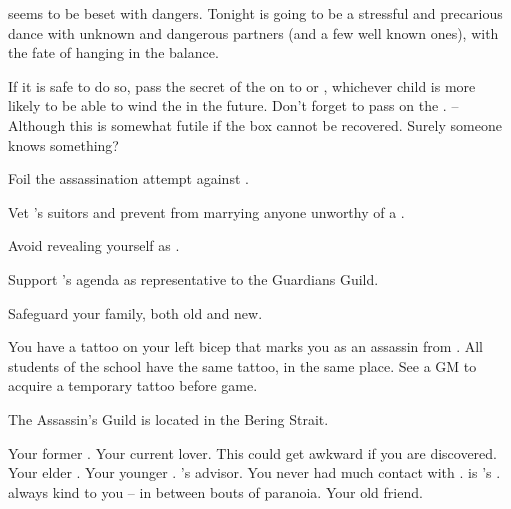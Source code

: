 \documentclass[char]{NeptuneBall}
\begin{document}
\pAtlantis{} seems to be beset with dangers. Tonight is going to be a stressful and precarious dance with unknown and dangerous partners (and a few well known ones), with the fate of \pAtlantis{} hanging in the balance.


\begin{itemz}[Goals]
  \item If it is safe to do so, pass the secret of the \iMusicBox{} on to \cAriel{} or \cPrincess{}, whichever child is more likely to be able to wind the \iMusicBox{} in the future. Don't forget to pass on the \iMusicBoxKey{}. -- Although this is somewhat futile if the box cannot be recovered. Surely someone knows something?
  \item Foil the assassination attempt against \cKing{}.
  \item Vet \cPrincess{}'s suitors and prevent \cPrincess{\them} from marrying anyone unworthy of a \cPrincess{\prince}.
  \item Avoid revealing yourself as \cQueen{\King} \cQueen{}.
	\item Support \cGeneral{}'s agenda as representative to the Guardians Guild.
	\item Safeguard your family, both old and new.
\end{itemz}


\begin{itemz}[Notes]
  \item You have a tattoo on your left bicep that marks you as an assassin from \pAssassin{}. All students of the school have the same tattoo, in the same place. See a GM to acquire a temporary tattoo before game.
\end{itemz}

\begin{itemz}[Trivia]
  \item The Assassin's Guild is located in the Bering Strait.
\end{itemz}

\begin{contacts}
  \contact{\cKing{}} Your former \cKing{\spouse}.
  \contact{\cGeneral{}} Your current lover. This could get awkward if you are discovered.
  \contact{\cAriel{}} Your elder \cAriel{\offspring}.
  \contact{\cPrincess{}} Your younger \cPrincess{{\offspring}}.
  \contact{\cManta{}} \cKing{}'s advisor. You never had much contact with \cManta{\them}.
  \contact{\cPlant{}} \cPlant{} is \cKing{}'s \cPlant{\sibling}. \cPlant{\they} \cPlant{\were} always kind to you -- in between bouts of paranoia.
  \contact{\cDiplomat{}} Your old friend.
\end{contacts}
\end{document}
